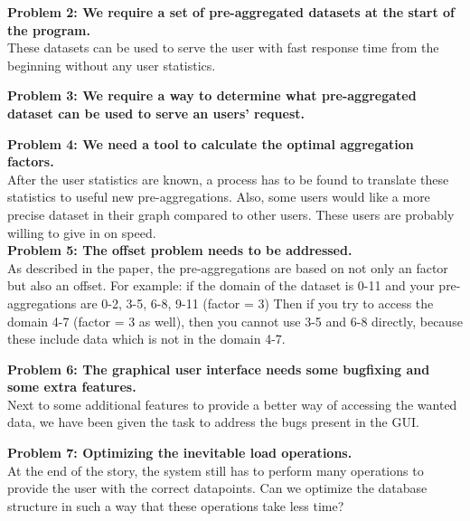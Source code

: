 \textbf{Problem 2: We require a set of pre-aggregated datasets at the start of the program.}\\
These datasets can be used to serve the user with fast response time from the beginning without any user statistics.

\textbf{Problem 3: We require a way to determine what pre-aggregated dataset can be used to serve an users' request.}


\textbf{Problem 4: We need a tool to calculate the optimal aggregation factors.}\\
After the user statistics are known, a process has to be found to translate these statistics to useful new pre-aggregations. Also, some users would like a more precise dataset in their graph compared to other users. These users are probably willing to give in on speed.\\

\textbf{Problem 5: The offset problem needs to be addressed.}\\
As described in the paper\cite{wombacher2011}, the pre-aggregations are based on not only an factor but also an offset. For example: if the domain of the dataset is 0-11 and your pre-aggregations are 0-2, 3-5, 6-8, 9-11 (factor = 3) Then if you try to access the domain 4-7 (factor = 3 as well), then you cannot use 3-5 and 6-8 directly, because these include data which is not in the domain 4-7. 

\textbf{Problem 6: The graphical user interface needs some bugfixing and some extra features.}\\
Next to some additional features to provide a better way of accessing the wanted data, we have been given the task to address the bugs present in the GUI.

\textbf{Problem 7: Optimizing the inevitable load operations.}\\
At the end of the story, the system still has to perform many operations to provide the user with the correct datapoints. Can we optimize the database structure in such a way that these operations take less time?
